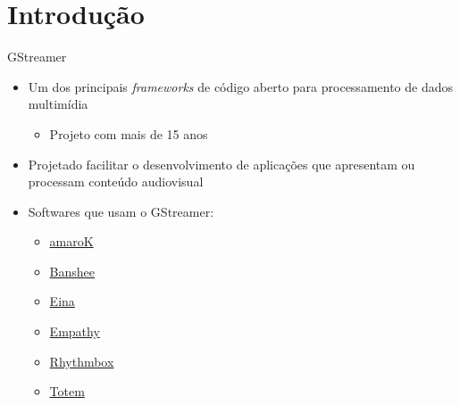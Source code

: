 \documentclass{beamer}
\def\en#1{\foreignlanguage{english}{\emph{#1}}}
\begin{document}
\begin{frame}{\contentsname}
  \tableofcontents
\end{frame}

\section{Introdução}
\label{sub:overview}

\begin{frame}[c]{GStreamer}
  \begin{itemize}
    \item Um dos principais \en{frameworks} de código aberto
      para processamento de dados multimídia
      \begin{itemize}
        \item Projeto com mais de 15 anos
      \end{itemize}
    \item Projetado facilitar o desenvolvimento de aplicações que apresentam
      ou processam conteúdo audiovisual
    \item Softwares que usam o GStreamer:
      \begin{itemize}
        \item \href{https://amarok.kde.org/}{amaroK}
        \item \href{http://banshee.fm/}{Banshee}
        \item \href{http://eina.sourceforge.net/}{Eina}
        \item \href{https://wiki.gnome.org/Apps/Empathy}{Empathy}
        \item \href{http://www.rhythmbox.org/}{Rhythmbox}
        \item \href{https://wiki.gnome.org/Apps/Videos}{Totem}
      \end{itemize}
  \end{itemize}
\end{frame}
\end{document}

